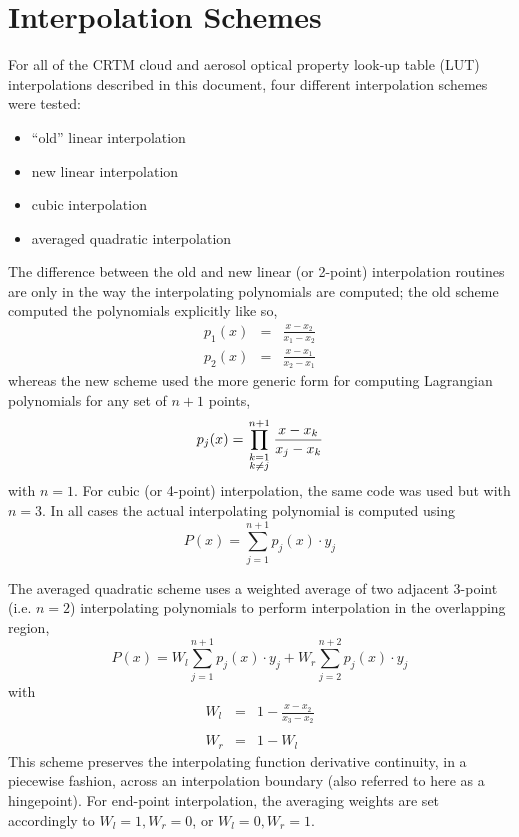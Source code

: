 \section{Interpolation Schemes}
For all of the CRTM cloud and aerosol optical property look-up table (LUT) interpolations described in this document, four different interpolation schemes were tested:
 \begin{itemize}
   \item{``old'' linear interpolation}
   \item{new linear interpolation}
   \item{cubic interpolation}
   \item{averaged quadratic interpolation}
 \end{itemize}
The difference between the old and new linear (or 2-point) interpolation routines are only in the way the interpolating polynomials are computed; the old scheme computed the polynomials explicitly like so,
\begin{eqnarray*}
  p_{1}(x) & = & \frac{x-x_{2}}{x_{1}-x_{2}} \\
  p_{2}(x) & = & \frac{x-x_{1}}{x_{2}-x_{1}}
\end{eqnarray*}
whereas the new scheme used the more generic form for computing Lagrangian polynomials for any set of $n+1$ points,
\begin{equation}
  p_{j}(x) = \prod_{\scriptstyle k=1 \atop \scriptstyle k \ne j}^{n+1}\frac{x-x_{k}}{x_{j}-x_{k}}
  \label{eqn:lagrangian_poly}
\end{equation}
with $n=1$. For cubic (or 4-point) interpolation, the same code was used but with $n=3$. In all cases the actual interpolating polynomial is computed using
\begin{equation}
  P(x) = \sum_{j=1}^{n+1} p_{j}(x)\cdot y_{j}
  \label{eqn:interpolating_poly}
\end{equation}

The averaged quadratic scheme\cite{ref:avgquad_interpolation} uses a weighted average of two adjacent 3-point (i.e. $n=2$) interpolating polynomials to perform interpolation in the overlapping region,
\begin{equation}
  P(x) = W_{l}\sum_{j=1}^{n+1} p_{j}(x)\cdot y_{j} + W_{r}\sum_{j=2}^{n+2} p_{j}(x)\cdot y_{j}
  \label{eqn:avgquad_poly}
\end{equation}
with
\begin{eqnarray*}
  W_{l} & = & 1 - \frac{x-x_{2}}{x_{3}-x_{2}}\\
   & & \\
  W_{r} & = & 1 - W_{l}
\end{eqnarray*}
This scheme preserves the interpolating function derivative continuity, in a piecewise fashion, across an interpolation boundary (also referred to here as a hingepoint). For end-point interpolation, the averaging weights are set accordingly to $W_{l}=1,W_{r}=0$, or $W_{l}=0,W_{r}=1$.

